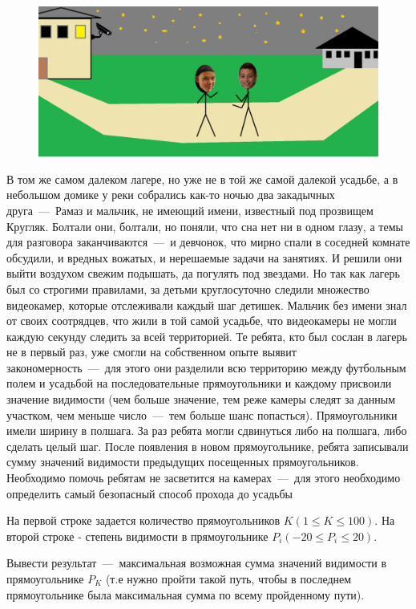 \begin{figure}[h!]
	\centering
	\includegraphics[width=0.8\linewidth, keepaspectratio]{boys.png}
\end{figure}

В том же самом далеком лагере, но уже не в той же самой далекой усадьбе, 
а в небольшом домике у реки собрались как-то ночью два закадычных друга~---~Рамаз и мальчик, не имеющий имени, известный под прозвищем Кругляк. 
Болтали они, болтали, но поняли, что сна нет ни в одном глазу, а темы для разговора заканчиваются~---~и девчонок, что мирно спали в соседней комнате обсудили, 
и вредных вожатых, и нерешаемые задачи на занятиях. И решили они выйти воздухом свежим подышать, да погулять под звездами. 
Но так как лагерь был со строгими правилами, за детьми круглосуточно следили множество видеокамер, которые отслеживали каждый шаг детишек. 
Мальчик без имени знал от своих соотрядцев, что жили в той самой усадьбе, что видеокамеры не могли каждую секунду следить за всей территорией. 
Те ребята, кто был сослан в лагерь не в первый раз, уже смогли на собственном опыте выявит закономерность~---~для этого они разделили 
всю территорию между футбольным полем и усадьбой на последовательные прямоугольники и каждому присвоили значение видимости 
(чем больше значение, тем реже камеры  следят за данным участком, чем меньше число~---~тем больше шанс попасться). 
Прямоугольники имели ширину в полшага. За раз ребята могли сдвинуться либо на полшага, либо сделать целый шаг. 
После появления в новом прямоугольнике, ребята записывали сумму значений видимости предыдущих посещенных прямоугольников.
Необходимо помочь ребятам не засветится на камерах~---~для этого необходимо определить самый безопасный способ прохода до усадьбы 

\InputFile
\noindent

На первой строке задается количество прямоугольников $K (1 \leq K \leq 100)$.
На второй строке - степень видимости в прямоугольнике $P_i (-20 \leq P_i \leq 20)$.

\OutputFile
\noindent

Вывести результат~---~максимальная возможная сумма значений видимости в прямоугольнике $P_K$ (т.е нужно пройти такой путь, чтобы в последнем прямоугольнике была максимальная сумма по всему пройденному пути). 

\SAMPLES